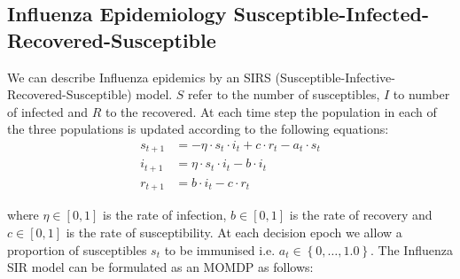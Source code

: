 \subsection{Influenza Epidemiology Susceptible-Infected-Recovered-Susceptible}
\label{sec:results_ee}

We can describe Influenza epidemics by an SIRS (Susceptible-Infective-Recovered-Susceptible) model. {\footnotesize $ S $} refer to the number of susceptibles, {\footnotesize $ I $} to number of infected and {\footnotesize $ R $} to the recovered. At each time step the population in each of the three populations is updated according to the following equations:
\begin{align*}
    s_{t + 1} &= -\eta \cdot s_t \cdot i_t + c \cdot r_t - a_t \cdot s_t \\
    i_{t + 1} &= \eta \cdot s_t \cdot i_t - b \cdot i_t \\
    r_{t+1} &= b \cdot i_t - c \cdot r_t 
\end{align*}

where {\footnotesize $ \eta \in [0, 1]$} is the rate of infection, {\footnotesize $ b \in [0, 1]$} is the rate of recovery and {\footnotesize $ c \in [0, 1]$} is the rate of susceptibility. At each decision epoch we allow a proportion of susceptibles {\footnotesize $ s_t $} to be immunised i.e. {\footnotesize $ a_t \in \left\lbrace 0, \ldots, 1.0\right\rbrace $}. The Influenza SIR model can be formulated as an MOMDP as follows:

